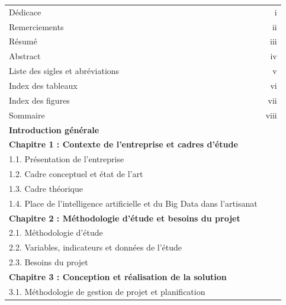 \begin{longtable}{@{}p{\dimexpr\textwidth-1.6cm\relax}@{}r@{}}
Dédicace & i\\
Remerciements & ii\\
Résumé & iii\\
Abstract & iv\\
Liste des sigles et abréviations & v\\
Index des tableaux & vi\\
Index des figures & vii\\
Sommaire & viii\\[0.5em]
\textbf{Introduction générale} & \pageref{sec:intro}\\[0.5em]
\textbf{Chapitre 1 : Contexte de l'entreprise et cadres d'étude} & \pageref{chap:un}\\
\hspace{1em}1.1. Présentation de l'entreprise & \pageref{sec:1-1}\\
\hspace{1em}1.2. Cadre conceptuel et état de l'art & \pageref{sec:1-2}\\
\hspace{1em}1.3. Cadre théorique & \pageref{sec:1-3}\\
\hspace{1em}1.4. Place de l'intelligence artificielle et du Big Data dans l'artisanat & \pageref{sec:1-4}\\[0.5em]
\textbf{Chapitre 2 : Méthodologie d'étude et besoins du projet} & \pageref{chap:deux}\\
\hspace{1em}2.1. Méthodologie d'étude & \pageref{sec:2-1}\\
\hspace{1em}2.2. Variables, indicateurs et données de l'étude & \pageref{sec:2-2}\\
\hspace{1em}2.3. Besoins du projet & \pageref{sec:2-3}\\[0.5em]
\textbf{Chapitre 3 : Conception et réalisation de la solution} & \pageref{chap:trois}\\
\hspace{1em}3.1. Méthodologie de gestion de projet et planification & \pageref{sec:3-1}\\


\end{longtable}
